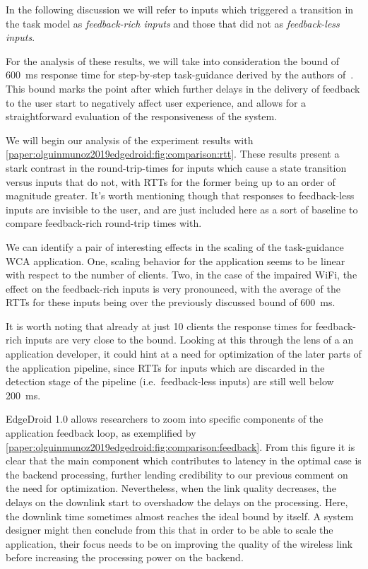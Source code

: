 In the following discussion we will refer to inputs which triggered a transition in the task model as \emph{feedback-rich inputs} and those that did not as \emph{feedback-less inputs}.

For the analysis of these results, we will take into consideration the bound of \SI{600}{\milli\second} response time for step-by-step task-guidance derived by the authors of~\cite{chen2017empirical}.
This bound marks the point after which further delays in the delivery of feedback to the user start to negatively affect user experience, and allows for a straightforward evaluation of the responsiveness of the system.

We will begin our analysis of the experiment results with \cref{paper:olguinmunoz2019edgedroid:fig:comparison:rtt}.
These results present a stark contrast in the round-trip-times for inputs which cause a state transition versus inputs that do not, with RTTs for the former being up to an order of magnitude greater.
It's worth mentioning though that responses to feedback-less inputs are invisible to the user, and are just included here as a sort of baseline to compare feedback-rich round-trip times with.

We can identify a pair of interesting effects in the scaling of the task-guidance \gls{WCA} application.
One, scaling behavior for the application seems to be linear with respect to the number of clients.
Two, in the case of the impaired WiFi, the effect on the feedback-rich inputs is very pronounced, with the average of the RTTs for these inputs being over the previously discussed bound of \SI{600}{\milli\second}.

It is worth noting that already at just 10 clients the response times for feedback-rich inputs are very close to the bound.
Looking at this through the lens of a an application developer, it could hint at a need for optimization of the later parts of the application pipeline, since RTTs for inputs which are discarded in the detection stage of the pipeline (i.e.\ feedback-less inputs) are still well below \SI{200}{\milli\second}.

EdgeDroid 1.0 allows researchers to zoom into specific components of the application feedback loop, as exemplified by \cref{paper:olguinmunoz2019edgedroid:fig:comparison:feedback}.
From this figure it is clear that the main component which contributes to latency in the optimal case is the backend processing, further lending credibility to our previous comment on the need for optimization.
Nevertheless, when the link quality decreases, the delays on the downlink start to overshadow the delays on the processing.
Here, the downlink time sometimes almost reaches the ideal bound by itself.
A system designer might then conclude from this that in order to be able to scale the application, their focus needs to be on improving the quality of the wireless link before increasing the processing power on the backend.

